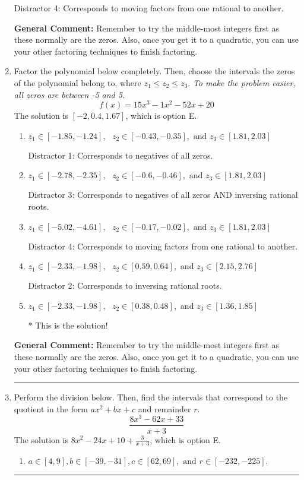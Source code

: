 \documentclass{extbook}[14pt]
\newcommand{\litem}[1]{\item #1

\rule{\textwidth}{0.4pt}}
\begin{document}
\begin{enumerate}
{\begin{enumerate}[label=\Alph*.]
 Distractor 4: Corresponds to moving factors from one rational to another.
\end{enumerate}

\textbf{General Comment:} Remember to try the middle-most integers first as these normally are the zeros. Also, once you get it to a quadratic, you can use your other factoring techniques to finish factoring.
}
\litem{
Factor the polynomial below completely. Then, choose the intervals the zeros of the polynomial belong to, where $z_1 \leq z_2 \leq z_3$. \textit{To make the problem easier, all zeros are between -5 and 5.}
\[ f(x) = 15x^{3} -1 x^{2} -52 x + 20 \]The solution is \( [-2, 0.4, 1.67] \), which is option E.\begin{enumerate}[label=\Alph*.]
\item \( z_1 \in [-1.85, -1.24], \text{   }  z_2 \in [-0.43, -0.35], \text{   and   } z_3 \in [1.81, 2.03] \)

 Distractor 1: Corresponds to negatives of all zeros.
\item \( z_1 \in [-2.78, -2.35], \text{   }  z_2 \in [-0.6, -0.46], \text{   and   } z_3 \in [1.81, 2.03] \)

 Distractor 3: Corresponds to negatives of all zeros AND inversing rational roots.
\item \( z_1 \in [-5.02, -4.61], \text{   }  z_2 \in [-0.17, -0.02], \text{   and   } z_3 \in [1.81, 2.03] \)

 Distractor 4: Corresponds to moving factors from one rational to another.
\item \( z_1 \in [-2.33, -1.98], \text{   }  z_2 \in [0.59, 0.64], \text{   and   } z_3 \in [2.15, 2.76] \)

 Distractor 2: Corresponds to inversing rational roots.
\item \( z_1 \in [-2.33, -1.98], \text{   }  z_2 \in [0.38, 0.48], \text{   and   } z_3 \in [1.36, 1.85] \)

* This is the solution!
\end{enumerate}

\textbf{General Comment:} Remember to try the middle-most integers first as these normally are the zeros. Also, once you get it to a quadratic, you can use your other factoring techniques to finish factoring.
}
\litem{
Perform the division below. Then, find the intervals that correspond to the quotient in the form $ax^2+bx+c$ and remainder $r$.
\[ \frac{8x^{3} -62 x + 33}{x + 3} \]The solution is \( 8x^{2} -24 x + 10 + \frac{3}{x + 3} \), which is option E.\begin{enumerate}[label=\Alph*.]
\item \( a \in [4, 9], b \in [-39, -31], c \in [62, 69], \text{ and } r \in [-232, -225]. \)


\end{enumerate}}
\end{enumerate}
\end{document}
